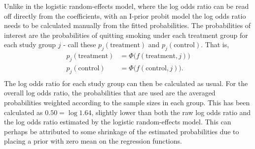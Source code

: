 \documentclass[a4paper,showframe,11pt]{report}\usepackage[]{graphicx}\usepackage[]{color}
\begin{document}
Unlike in the logistic random-effects model, where the log odds ratio can be read off directly from the coefficients, with an I-prior probit model the log odds ratio needs to be calculated manually from the fitted probabilities. The probabilities of interest are the probabilities of quitting smoking under each treatment group for each study group $j$ - call these $p_j(\text{treatment})$ and $p_j(\text{control})$. That is,
\begin{align*}
  p_j(\text{treatment}) &= \Phi\big( f(\text{treatment}, j) \big) \\
  p_j(\text{control})   &= \Phi\big( f(\text{control}, j) \big). \\
\end{align*}
The log odds ratio for each study group can then be calculated as usual.
For the overall log odds ratio, the probabilities that are used are the averaged probabilities weighted according to the sample sizes in each group. This has been calculated as $0.50 = \log 1.64$, slightly lower than both the raw log odds ratio and the log odds ratio estimated by the logistic random-effects model. This can perhaps be attributed to some shrinkage of the estimated probabilities due to placing a prior with zero mean on the regression functions.

\end{document}
